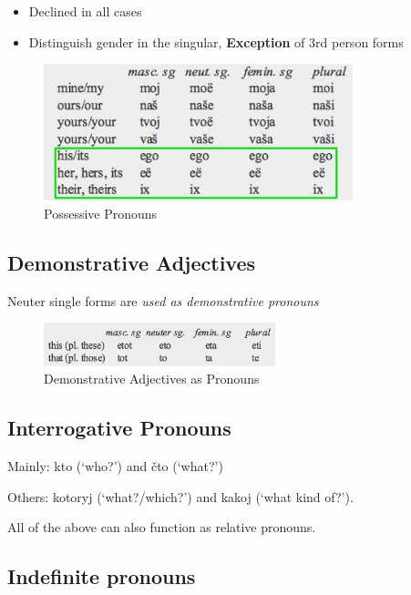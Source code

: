 \documentclass[
  a4paperpaper,
]{report}
\providecommand{\tightlist}{%
  \setlength{\itemsep}{0pt}\setlength{\parskip}{0pt}}
\begin{document}
\begin{itemize}
\tightlist
\item
  Declined in all cases
\item
  Distinguish gender in the singular, \textbf{Exception} of 3rd person
  forms
\end{itemize}

\begin{figure}
\centering
\includegraphics[width=0.8\textwidth,height=\textheight]{./pospron.jpg}
\caption{Possessive Pronouns}
\end{figure}

\hypertarget{demonstrative-adjectives}{%
\subsection{Demonstrative Adjectives}\label{demonstrative-adjectives}}

Neuter single forms are \emph{used as demonstrative pronouns}

\begin{figure}
\centering
\includegraphics[width=0.6\textwidth,height=\textheight]{./demad.jpg}
\caption{Demonstrative Adjectives as Pronouns}
\end{figure}

\hypertarget{interrogative-pronouns}{%
\subsection{Interrogative Pronouns}\label{interrogative-pronouns}}

Mainly: kto (`who?') and čto (`what?')

Others: kotoryj (`what?/which?') and kakoj (`what kind of?').

All of the above can also function as relative pronouns.

\hypertarget{indefinite-pronouns}{%
\subsection{Indefinite pronouns}\label{indefinite-pronouns}}
\end{document}

